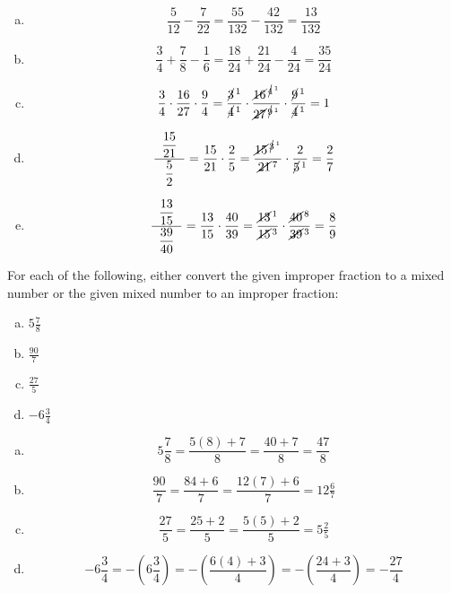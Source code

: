 \documentclass[11pt,letterpaper]{article}
\begin{document}
\sol
\begin{enumerate}[(a)]
\item
	\[
	\dfrac{5}{12} - \dfrac{7}{22}= \dfrac{55}{132} - \dfrac{42}{132}= \dfrac{13}{132}
	\] \pspace

\item
	\[
	\dfrac{3}{4} + \frac{7}{8} - \frac{1}{6}= \dfrac{18}{24} + \dfrac{21}{24} - \dfrac{4}{24}= \dfrac{35}{24}
	\] \pspace

\item
	\[
	\dfrac{3}{4} \cdot \dfrac{16}{27} \cdot \dfrac{9}{4}= \dfrac{\cancel{3}^{\,1}}{\cancel{4}^{\,1}} \cdot \dfrac{\cancel{16}^{\,\cancel{4}^{\,1}}}{\cancel{27}^{\,\cancel{9}^{\,1}}} \cdot \dfrac{\cancel{9}^{\,1}}{\cancel{4}^{\,1}}= 1
	\] \pspace

\item
	\[
	\dfrac{\;\;\dfrac{15}{21}\;\;}{\;\;\dfrac{5}{2}\;\;}= \dfrac{15}{21} \cdot \dfrac{2}{5}= \dfrac{\cancel{15}^{\,\cancel{3}^{\,1}}}{\cancel{21}^{\,7}} \cdot \dfrac{2}{\cancel{5}^{\,1}}= \dfrac{2}{7}
	\] \pspace

\item
	\[
	\dfrac{\;\;\dfrac{13}{15}\;\;}{\;\;\dfrac{39}{40}\;\;}= \dfrac{13}{15} \cdot \dfrac{40}{39}= \dfrac{\cancel{13}^{\,1}}{\cancel{15}^{\,3}} \cdot \dfrac{\cancel{40}^{\,8}}{\cancel{39}^{\,3}}= \dfrac{8}{9}
	\]
\end{enumerate}



\newpage



 For each of the following, either convert the given improper fraction to a mixed number or the given mixed number to an improper fraction:
	\begin{enumerate}[(a)]
	\item $5 \frac{7}{8}$
	\item $\frac{90}{7}$
	\item $\frac{27}{5}$
	\item $-6 \frac{3}{4}$
	\end{enumerate} \pspace

\sol
\begin{enumerate}[(a)]
\item 
	\[
	5 \frac{7}{8}= \dfrac{5(8) + 7}{8}= \dfrac{40 + 7}{8}= \dfrac{47}{8}
	\] \pspace

\item 
	\[
	\dfrac{90}{7}= \dfrac{84 + 6}{7}= \dfrac{12(7) + 6}{7}= 12 \tfrac{6}{7}
	\] \pspace

\item 
	\[
	\dfrac{27}{5}= \dfrac{25 + 2}{5}= \dfrac{5(5) + 2}{5}= 5 \tfrac{2}{5}
	\] \pspace

\item 
	\[
	-6 \frac{3}{4}= - \left( 6 \frac{3}{4} \right)= -\left( \dfrac{6(4) + 3}{4} \right)= -\left( \dfrac{24 + 3}{4} \right)= -\dfrac{27}{4}
	\]
\end{enumerate}
\end{document}
